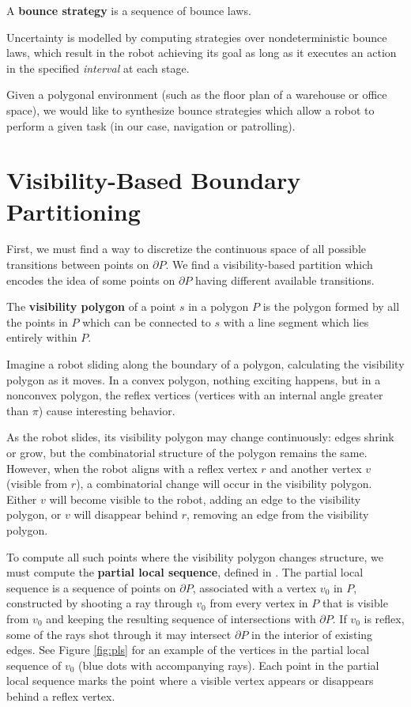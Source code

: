 \documentclass[]{styles/svproc}  %
\begin{document}
\begin{definition}
A \textbf{bounce strategy} is a sequence of bounce
laws.
\end{definition}

Uncertainty is modelled by computing strategies over nondeterministic bounce
laws, which result in the robot achieving its goal as long as it executes an
action in the specified \emph{interval} at each stage.

Given a polygonal environment (such as the floor plan of a warehouse or office
space), we would like to synthesize bounce strategies which allow a robot to
perform a given task (in our case, navigation or patrolling).



\section{Visibility-Based Boundary Partitioning} \label{sec:partition}

First, we must find a way to discretize the continuous space of all possible
transitions between points on $\partial P$. We find a visibility-based partition
which encodes the idea of some points on $\partial P$ having different
available transitions.

\begin{definition}
The \textbf{visibility polygon} of a point $s$ in a polygon $P$ is the polygon
formed by all the points in $P$ which can be connected to $s$ with a line
segment which lies entirely within $P$.
\end{definition}

Imagine a robot sliding along the boundary of a polygon, calculating 
the visibility polygon as it moves. In a convex polygon, nothing exciting 
happens, but in a nonconvex polygon, the reflex vertices (vertices with an
internal angle greater than $\pi$) cause interesting
behavior.

As the robot slides, its visibility polygon may change continuously: edges
shrink or grow, but the combinatorial structure of the polygon remains the same.
However, when the robot aligns with a reflex vertex $r$ and another vertex $v$ (visible
from $r$), a combinatorial change will occur in the visibility polygon. Either 
$v$ will become visible to the robot, adding an edge to the visibility 
polygon, or $v$ will disappear behind $r$, removing an edge from the visibility polygon.

To compute all such points where the visibility polygon changes structure, we
must compute the \textbf{partial local sequence}, defined in \cite{rourke_viz}.
The partial local sequence is a sequence of points on $\partial P$, associated with 
a vertex $v_0$ in $P$, constructed by shooting a ray through $v_0$ from every vertex in $P$
that is visible from $v_0$ and keeping the resulting sequence of intersections with
$\partial P$. If $v_0$ is reflex, some of the rays shot through it may intersect
$\partial P$ in the interior of existing edges. See Figure \ref{fig:pls} for an
example of the vertices in the partial local sequence of $v_0$ (blue dots with
accompanying rays). Each point in the partial local sequence marks the point
where a visible vertex appears or disappears behind a reflex vertex.
\end{document}
